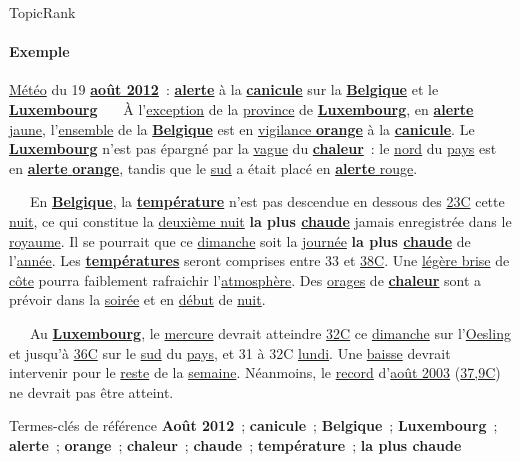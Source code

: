 \begin{frame}{TopicRank}\framesubtitle{Exemple}
  \begin{exampleblock}{\small
    \underline{Météo} du 19 \underline{\textbf{août 2012}}~:
    \underline{\textbf{\textcolor{termithorange}{alerte}}} à la
    \underline{\textbf{canicule}} sur la
    \underline{\textbf{Belgique}} et le \underline{\textbf{Luxembourg}}
  }\justifying\small
    ~~~À l'\underline{exception} de la \underline{province} de
    \underline{\textbf{Luxembourg}}, en
    \underline{\textcolor{termithorange}{\textbf{alerte} jaune}},
    l'\underline{ensemble} de la \underline{\textbf{Belgique}} est en
    \underline{vigilance \textbf{orange}} à la
    \underline{\textbf{canicule}}. Le \underline{\textbf{Luxembourg}} n'est
    pas épargné par la \underline{vague} du \underline{\textbf{chaleur}}~: le
    \underline{nord} du \underline{pays} est en
    \underline{\textcolor{termithorange}{\textbf{alerte} \textbf{orange}}},
    tandis que le \underline{sud} a était placé en
    \underline{\textcolor{termithorange}{\textbf{alerte} rouge}}.

    ~~~En \underline{\textbf{Belgique}}, la \underline{\textbf{température}}
    n'est pas descendue en dessous des \underline{23\degre{}C} cette
    \underline{nuit}, ce qui constitue la \underline{deuxième nuit}
    \textbf{la plus \underline{chaude}} jamais enregistrée dans le
    \underline{royaume}. Il se pourrait que ce \underline{dimanche} soit la
    \underline{journée} \textbf{la plus \underline{chaude}} de l'\underline{année}.
    Les \underline{\textbf{températures}} seront comprises entre 33 et
    \underline{38\degre{}C}. Une \underline{légère brise} de
    \underline{côte} pourra faiblement rafraichir l'\underline{atmosphère}. Des
    \underline{orages} de \underline{\textbf{chaleur}} sont a prévoir dans la
    \underline{soirée} et en \underline{début} de \underline{nuit}.

    ~~~Au \underline{\textbf{Luxembourg}}, le \underline{mercure} devrait
    atteindre \underline{32\degre{}C} ce \underline{dimanche} sur l'\underline{Oesling}
    et jusqu'à \underline{36\degre{}C} sur le \underline{sud} du \underline{pays}, et
    31 à 32\degre{}C \underline{lundi}. Une \underline{baisse} devrait intervenir
    pour le \underline{reste} de la \underline{semaine}. Néanmoins, le
    \underline{record} d'\underline{août 2003} (\underline{37,9\degre{}C}) ne devrait
    pas être atteint.

    \begin{exampleblock}{\small Termes-clés de référence}\justifying\small
      \textbf{Août 2012}~; \textbf{canicule}~;
      \textbf{Belgique}~; \textbf{Luxembourg}~; \textbf{alerte}~;
      \textbf{orange}~; \textbf{chaleur}~; \textbf{chaude}~;
      \textbf{température}~; \textbf{la plus chaude}
    \end{exampleblock}
  \end{exampleblock}
\end{frame}


